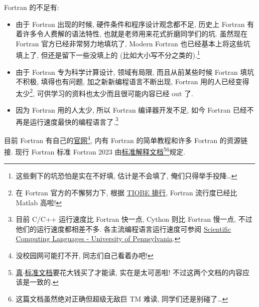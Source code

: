 Fortran 的不足有:
\begin{itemize}
    \item 由于 Fortran 出现的时候, 硬件条件和程序设计观念都不足, 历史上 Fortran 有着许多令人费解的语法特性, 也就是老师用来花式折磨同学们的坑. 虽然现在 Fortran 官方已经非常努力地填坑了, Modern Fortran 也已经基本上将这些坑填上了, 但还是留下一些没填上的 (比如大小写不分之类的).\footnote{这些剩下的坑恐怕是实在不好填, 估计是不会填了, 俺们只得举手投降\dots{}}
    \item 由于 Fortran 专为科学计算设计, 领域有局限, 而且从前某些时候 Fortran 填坑不积极, 填得也有问题, 加之新新编程语言不断出现, Fortran 用的人已经变得太少\footnote{在 Fortran 官方的不懈努力下, 根据 \href{https://www.tiobe.com/tiobe-index/}{TIOBE 排行}, Fortran 流行度已经比 Matlab 高啦!}, 可供学习的资料也太少而且很可能内容已经 out 了.
    \item 因为 Fortran 用的人太少, 所以 Fortran 编译器开发不足, 如今 Fortran 已经不再是运行速度最快的编程语言了.\footnote{目前 C/C++ 运行速度比 Fortran 快一点, Cython 则比 Fortran 慢一点, 不过他们的运行速度都相差不多. 各主流编程语言运行速度可参阅 \href{https://www.sas.upenn.edu/~jesusfv/Lecture_HPC_5_Scientific_Computing_Languages.pdf}{Scientific Computing Languages - University of Pennsylvania}.}
\end{itemize}

目前 Fortran 有自己的\href{https://fortran-lang.org/}{官网}\footnote{没校园网可能打不开, 同志们自己看着办吧!}, 内有 Fortran 的简单教程和许多 Fortran 的资源链接. 现行 Fortran 标准 Fortran 2023 由\href{https://j3-fortran.org/doc/year/24/24-007.pdf}{标准解释文档}\footnote{\href{https://www.iso.org/standard/82170.html}{真$\cdot$标准文档}要花大钱买了才能读, 实在是太可恶啦! 不过这两个文档的内容应该是一致的.}\footnote{这篇文档虽然绝对正确但超级无敌巨 TM 难读, 同学们还是别碰了\dots{}}规定.
